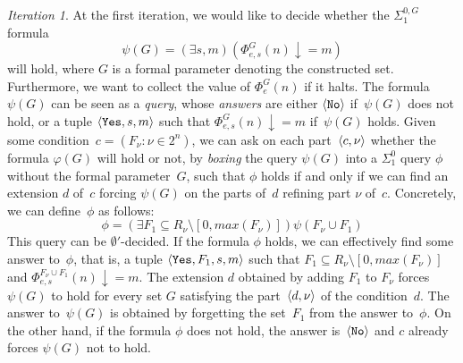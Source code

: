 \emph{Iteration 1}. At the first iteration, we would like to decide whether
the $\Sigma^{0,G}_1$ formula
\[
\psi(G) = (\exists s, m)(\Phi^{G}_{e,s}(n) \downarrow = m)
\]
will hold, where $G$ is a formal parameter denoting the constructed set.
Furthermore, we want to collect the value of $\Phi^G_e(n)$ if it halts.
The formula $\psi(G)$ can be seen as a \emph{query}, whose \emph{answers} are
either $\left\langle \mathtt{No} \right\rangle$ if~$\psi(G)$ does not hold, or a tuple $\left\langle \mathtt{Yes}, s, m \right\rangle$
such that $\Phi^G_{e,s}(n) \downarrow = m$ if~$\psi(G)$ holds.
Given some condition~$c = (F_\nu : \nu \in 2^n)$, we can ask on each part~$\left\langle c,\nu \right\rangle$
whether the formula $\varphi(G)$ will hold or not, by \emph{boxing} the query $\psi(G)$
into a $\Sigma^0_1$ query $\phi$ without the formal parameter~$G$, such that $\phi$ holds if and only if
we can find an extension $d$ of~$c$ forcing $\psi(G)$ on the parts of~$d$
refining part $\nu$ of~$c$. Concretely, we can define~$\phi$ as follows:
\[
\phi = (\exists F_1 \subseteq R_\nu \setminus [0, max(F_\nu)])\psi(F_\nu \cup F_1)
\]
This query can be $\emptyset'$-decided. If the formula $\phi$ holds, 
we can effectively find some answer to~$\phi$, that is, 
a tuple $\left\langle \mathtt{Yes}, F_1, s, m \right\rangle$ such that $F_1 \subseteq R_\nu \setminus [0, max(F_\nu)]$
and $\Phi^{F_\nu \cup F_1}_{e,s}(n) \downarrow = m$. The extension $d$ obtained by adding $F_1$ to $F_\nu$
forces $\psi(G)$ to hold for every set $G$ satisfying the part~$\left\langle d,\nu \right\rangle$ of the condition~$d$.
The answer to~$\psi(G)$ is obtained by forgetting the set~$F_1$ from the answer to~$\phi$.
On the other hand, if the formula $\phi$ does not hold, the answer is~$\left\langle \mathtt{No} \right\rangle$
and $c$ already forces $\psi(G)$ not to hold.
\smallskip

